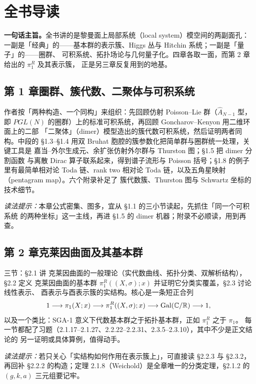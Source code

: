 \chapter*{全书导读}

\noindent\textbf{一句话主旨。}全书讲的是黎曼面上局部系统（local system）模空间的两副面孔：
一副是「经典」的——基本群的表示簇、Higgs 丛与 Hitchin 系统；一副是「量子」的——圈群、
可积系统、拓扑场论与几何量子化。四章各取一面，而第 2 章给出的 $\pi^R_1$ 及其表示簇，
正是另三章反复用到的地基。

\section*{第 1 章\quad 圈群、簇代数、二聚体与可积系统}

作者按「两种构造、一个同构」来组织：先回顾仿射 Poisson--Lie 群（$\hat A_{N-1}$ 型，
即 $PGL(N)$ 的圈群）上的标准可积系统，再回顾 Goncharov--Kenyon 用二维环面上的二部
「二聚体」（dimer）模型造出的簇代数可积系统，然后证明两者同构。中段的
\S1.3--\S1.4 用双 Bruhat 胞腔的簇参数化把简单群与圈群统一处理，关键工具是
嘉当--外尔生成元、余扩张仿射外尔群与 Thurston 图；\S1.5 把 dimer 分割函数
与离散 Dirac 算子联系起来，得到谱子流形与 Poisson 括号；\S1.8 的例子里有最简单相对论
Toda 链、rank two 相对论 Toda 链，以及五角星映射（pentagram map）。六个附录补足了
簇代数簇、Thurston 图与 Schwartz 坐标的技术细节。

\emph{读法提示：}本章公式密集、图多，宜从 \S1.1 的三小节读起，先抓住「同一个可积系统
的两种坐标」这一主线，再进 \S1.5 的 dimer 机器；附录不必顺读，用到再查。

\section*{第 2 章\quad 克莱因曲面及其基本群}

三节：\S2.1 讲 克莱因曲面的一般理论（实代数曲线、拓扑分类、双解析结构），\S2.2 定义
克莱因曲面的基本群 $\pi^R_1((X,\sigma);x)$ 并证明它分类实覆盖，\S2.3 讨论线性表示、
酉表示与酉表示簇的实结构。核心是一条短正合列
\[
1\longrightarrow \pi_1(X;x)\longrightarrow \pi^R_1((X,\sigma);x)
\longrightarrow \operatorname{Gal}(\mathbb{C}/\mathbb{R})\longrightarrow 1,
\]
以及一个类比：SGA-1 意义下代数基本群之于拓扑基本群，正如 $\pi^R_1$ 之于 $\pi_1$。
每一节都配了习题（2.1.17--2.1.27、2.2.22--2.2.31、2.3.5--2.3.10），其中不少是正文结论的
另一证明或具体算例，值得动手。

\emph{读法提示：}若只关心「实结构如何作用在表示簇上」，可直接读 \S2.2.3 与 \S2.3.2，
再回补 \S2.2.2 的构造；定理 2.1.8（Weichold）是全章唯一的分类定理，\S2.1.2 的
$(g,k,a)$ 三元组要记牢。

